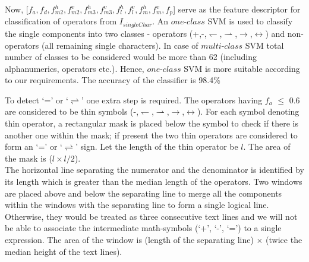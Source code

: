 \documentclass[12pt]{IEEEtran}
\begin{document}
\begin{itemize}
Now, [$f_a,f_d,f_{m2}^h,f_{m2}^v,f_{m3}^h,f_{m3}^v,f_l^h,f_l^v,f_m^h,f_m^v,f_p$] serve as the feature descriptor for classification of operators from 
$I_{singleChar}$. An $one$-$class$ SVM is used to classify the single components into two classes - operators (+,-,$\leftharpoondown$,$\rightharpoonup$,$\rightarrow$,$\leftrightarrow$)
and non-operators (all remaining single characters). In case of $multi$-$class$ SVM total number of classes to be considered would be more than 62 (including alphanumerics, operators etc.).
Hence, $one$-$class$ SVM is more suitable according to our requirements. The accuracy of the classifier is 98.4\% 

To detect `=' or `$\rightleftharpoons$' one extra step is required. 
The operators having $f_a$ $\leq$ 0.6 are considered to be thin symbols (-,$\leftharpoondown$,$\rightharpoonup$,$\rightarrow$,$\leftrightarrow$). 
 For each symbol denoting thin operator, a rectangular mask is placed below the
symbol to check if there is another one within the mask; if present the two thin operators are considered to form
an `=' or `$\rightleftharpoons$' sign. Let the length of the thin operator be $l$. The area of the  mask is  ($l \times l/2$).\\

The horizontal line separating  the numerator and the denominator is identified by its length which is greater than
the median length of the operators. Two windows are placed above and below  the separating line to merge all
the components within the windows with the separating line to form a single logical line. Otherwise, they would be
treated as three consecutive text lines and we will not be able to associate the intermediate math-symbols (`+', `-', `=')
 to a single expression. The area of the window is (length of the separating line) $\times$ (twice the median height of the text
lines).



\end{itemize}
\end{document}
